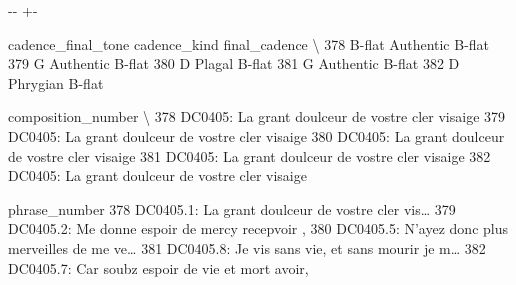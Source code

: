 \documentclass[letterpaper,10pt,english]{sphinxmanual}
\newlength\nbsphinxcodecellspacing
\begin{document}
{

\kern-\sphinxverbatimsmallskipamount\kern-\baselineskip
\kern+\FrameHeightAdjust\kern-\fboxrule
\vspace{\nbsphinxcodecellspacing}

\begin{sphinxVerbatim}[commandchars=\\\{\}]
\llap{\color{nbsphinxout}[35]:\,\hspace{\fboxrule}\hspace{\fboxsep}}    cadence\_final\_tone cadence\_kind final\_cadence  \textbackslash{}
378             B-flat    Authentic        B-flat
379                  G    Authentic        B-flat
380                  D       Plagal        B-flat
381                  G    Authentic        B-flat
382                  D     Phrygian        B-flat

                                   composition\_number  \textbackslash{}
378  DC0405: La grant doulceur de vostre cler visaige
379  DC0405: La grant doulceur de vostre cler visaige
380  DC0405: La grant doulceur de vostre cler visaige
381  DC0405: La grant doulceur de vostre cler visaige
382  DC0405: La grant doulceur de vostre cler visaige

                                         phrase\_number
378  DC0405.1: La grant doulceur de vostre cler vis{\ldots}
379     DC0405.2: Me donne espoir de mercy recepvoir ,
380  DC0405.5: N'ayez donc plus merveilles de me ve{\ldots}
381  DC0405.8: Je vis sans vie, et sans mourir je m{\ldots}
382   DC0405.7: Car soubz espoir de vie et mort avoir,
\end{sphinxVerbatim}
}
\end{document}
